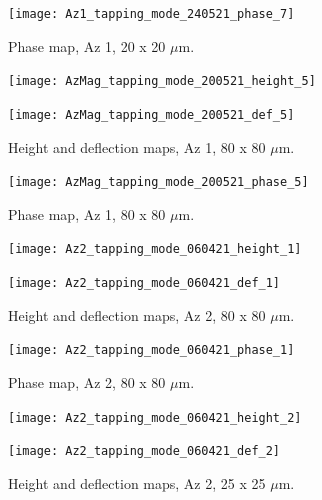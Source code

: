 \begin{figure}[H]
\centering
  \texttt{[image: Az1\_tapping\_mode\_240521\_phase\_7]}
\caption[Phase map, Az 1]{Phase map, Az 1, 20 x 20 $\mu$m.}
\label{fig:afm_az1_phase_7}
\end{figure}


\begin{figure}[H]
\centering
\begin{minipage}{.45\textwidth}
  \centering
  \texttt{[image: AzMag\_tapping\_mode\_200521\_height\_5]}
\end{minipage}
\begin{minipage}{.45\textwidth}
  \centering
  \texttt{[image: AzMag\_tapping\_mode\_200521\_def\_5]}
\end{minipage}
\caption[Height and deflection maps, Az 1]{Height and deflection maps, Az 1, 80 x 80 $\mu$m.}
\label{fig:afm_az1_height_def_8}
\end{figure}

\begin{figure}[H]
\centering
  \texttt{[image: AzMag\_tapping\_mode\_200521\_phase\_5]}
\caption[Phase map, Az 1]{Phase map, Az 1, 80 x 80 $\mu$m.}
\label{fig:afm_az1_phase_8}
\end{figure}




\begin{figure}[H]
\centering
\begin{minipage}{.45\textwidth}
  \centering
  \texttt{[image: Az2\_tapping\_mode\_060421\_height\_1]}
\end{minipage}
\begin{minipage}{.45\textwidth}
  \centering
  \texttt{[image: Az2\_tapping\_mode\_060421\_def\_1]}
\end{minipage}
\caption[Height and deflection maps, Az 2]{Height and deflection maps, Az 2, 80 x 80 $\mu$m.}
\label{fig:afm_az2_height_def_1}
\end{figure}

\begin{figure}[H]
\centering
  \texttt{[image: Az2\_tapping\_mode\_060421\_phase\_1]}
\caption[Phase map, Az 2]{Phase map, Az 2, 80 x 80 $\mu$m.}
\label{fig:afm_az2_phase_1}
\end{figure}

\begin{figure}[H]
\centering
\begin{minipage}{.45\textwidth}
  \centering
  \texttt{[image: Az2\_tapping\_mode\_060421\_height\_2]}
\end{minipage}
\begin{minipage}{.45\textwidth}
  \centering
  \texttt{[image: Az2\_tapping\_mode\_060421\_def\_2]}
\end{minipage}
\caption[Height and deflection maps, Az 2]{Height and deflection maps, Az 2, 25 x 25 $\mu$m.}
\label{fig:afm_az2_height_def_2}
\end{figure}

